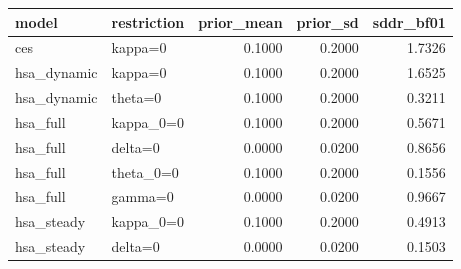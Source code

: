 \begin{tabular}{llrrr}
\toprule
model & restriction & prior\_mean & prior\_sd & sddr\_bf01 \\
\midrule
ces & kappa=0 & 0.1000 & 0.2000 & 1.7326 \\
hsa\_dynamic & kappa=0 & 0.1000 & 0.2000 & 1.6525 \\
hsa\_dynamic & theta=0 & 0.1000 & 0.2000 & 0.3211 \\
hsa\_full & kappa\_0=0 & 0.1000 & 0.2000 & 0.5671 \\
hsa\_full & delta=0 & 0.0000 & 0.0200 & 0.8656 \\
hsa\_full & theta\_0=0 & 0.1000 & 0.2000 & 0.1556 \\
hsa\_full & gamma=0 & 0.0000 & 0.0200 & 0.9667 \\
hsa\_steady & kappa\_0=0 & 0.1000 & 0.2000 & 0.4913 \\
hsa\_steady & delta=0 & 0.0000 & 0.0200 & 0.1503 \\
\bottomrule
\end{tabular}
